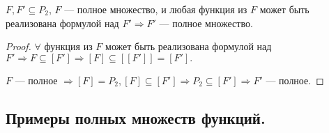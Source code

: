 \begin{lemma}
	$F, F' \subseteq P_2$, $F$ --- полное множество, и любая функция из $F$ может быть реализована формулой над $F' \Rightarrow F'$ --- полное множество.
\end{lemma}
\begin{proof}
	$\forall$ функция из $F$ может быть реализована формулой над $F' \Rightarrow F \subseteq [F'] \Rightarrow [F] \subseteq [[F']] = [F'].$

	$F$ --- полное $\Rightarrow [F] = P_2, [F] \subseteq [F'] \Rightarrow P_2 \subseteq [F'] \Rightarrow F'$ --- полное.
\end{proof}

\subsection{Примеры полных множеств функций.}

